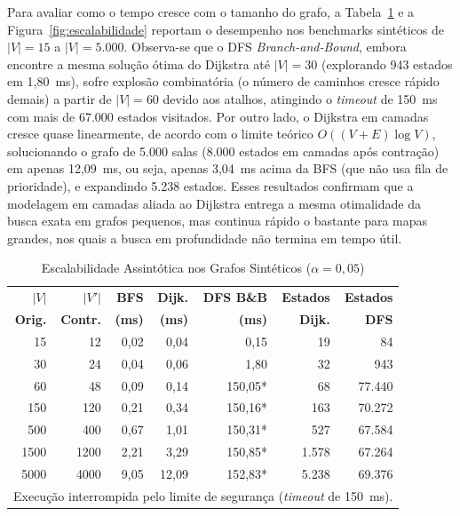 \documentclass[conference]{IEEEtran}
\begin{document}
Para avaliar como o tempo cresce com o tamanho do grafo, a Tabela~\ref{tab:sinteticos} e a Figura~\ref{fig:escalabilidade} reportam o desempenho nos benchmarks sint\'eticos de $|V|=15$ a $|V|=5.000$. Observa-se que o DFS \textit{Branch-and-Bound}, embora encontre a mesma solu\c{c}\~ao \'otima do Dijkstra at\'e $|V|=30$ (explorando 943 estados em 1,80~ms), sofre explos\~ao combinat\'oria (o n\'umero de caminhos cresce r\'apido demais) a partir de $|V|=60$ devido aos atalhos, atingindo o \textit{timeout} de 150~ms com mais de 67.000 estados visitados. Por outro lado, o Dijkstra em camadas cresce quase linearmente, de acordo com o limite te\'orico $O((V+E)\log V)$, solucionando o grafo de 5.000 salas (8.000 estados em camadas ap\'os contra\c{c}\~ao) em apenas 12,09~ms, ou seja, apenas 3,04~ms acima da BFS (que n\~ao usa fila de prioridade), e expandindo 5.238 estados. Esses resultados confirmam que a modelagem em camadas aliada ao Dijkstra entrega a mesma otimalidade da busca exata em grafos pequenos, mas continua r\'apido o bastante para mapas grandes, nos quais a busca em profundidade n\~ao termina em tempo \'util.

\begin{table}[!htbp]
\caption{Escalabilidade Assint\'otica nos Grafos Sint\'eticos ($\alpha = 0{,}05$)}
\label{tab:sinteticos}
\centering
\scriptsize
\setlength{\tabcolsep}{3.4pt}
\begin{tabular}{rrrrrrr}
\toprule
$|V|$ & $|V'|$ & \textbf{BFS} & \textbf{Dijk.} & \textbf{DFS B\&B} & \textbf{Estados} & \textbf{Estados} \\
\textbf{Orig.} & \textbf{Contr.} & \textbf{(ms)} & \textbf{(ms)} & \textbf{(ms)} & \textbf{Dijk.} & \textbf{DFS} \\
\midrule
  15 &   12 &  0,02 &  0,04 &   0,15 &    19 &     84 \\
  30 &   24 &  0,04 &  0,06 &   1,80 &    32 &    943 \\
  60 &   48 &  0,09 &  0,14 & 150,05* &    68 & 77.440 \\
 150 &  120 &  0,21 &  0,34 & 150,16* &   163 & 70.272 \\
 500 &  400 &  0,67 &  1,01 & 150,31* &   527 & 67.584 \\
1500 & 1200 &  2,21 &  3,29 & 150,85* & 1.578 & 67.264 \\
5000 & 4000 &  9,05 & 12,09 & 152,83* & 5.238 & 69.376 \\
\bottomrule
\multicolumn{7}{l}{\tiny *Execu\c{c}\~ao interrompida pelo limite de seguran\c{c}a (\textit{timeout} de 150~ms).}
\end{tabular}
\end{table}
\end{document}
